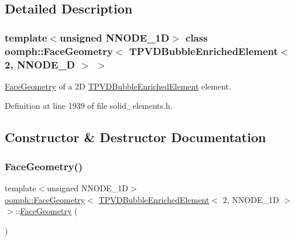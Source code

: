 \subsection{Detailed Description}
\subsubsection*{template$<$unsigned N\+N\+O\+D\+E\+\_\+1D$>$\newline
class oomph\+::\+Face\+Geometry$<$ T\+P\+V\+D\+Bubble\+Enriched\+Element$<$ 2, N\+N\+O\+D\+E\+\_\+D $>$ $>$}

\hyperlink{classoomph_1_1FaceGeometry}{Face\+Geometry} of a 2D \hyperlink{classoomph_1_1TPVDBubbleEnrichedElement}{T\+P\+V\+D\+Bubble\+Enriched\+Element} element. 

Definition at line 1939 of file solid\+\_\+elements.\+h.



\subsection{Constructor \& Destructor Documentation}
\mbox{\label{classoomph_1_1FaceGeometry_3_01TPVDBubbleEnrichedElement_3_012_00_01NNODE__1D_01_4_01_4_a4582a47d17bb5c7a2255da3e855aa4ec}} 
\subsubsection{\texorpdfstring{Face\+Geometry()}{FaceGeometry()}}
{\footnotesize\ttfamily template$<$unsigned N\+N\+O\+D\+E\+\_\+1D$>$ \\
\hyperlink{classoomph_1_1FaceGeometry}{oomph\+::\+Face\+Geometry}$<$ \hyperlink{classoomph_1_1TPVDBubbleEnrichedElement}{T\+P\+V\+D\+Bubble\+Enriched\+Element}$<$ 2, N\+N\+O\+D\+E\+\_\+1D $>$ $>$\+::\hyperlink{classoomph_1_1FaceGeometry}{Face\+Geometry} (\begin{DoxyParamCaption}{ }\end{DoxyParamCaption})\hspace{0.3cm}{\ttfamily [inline]}}




